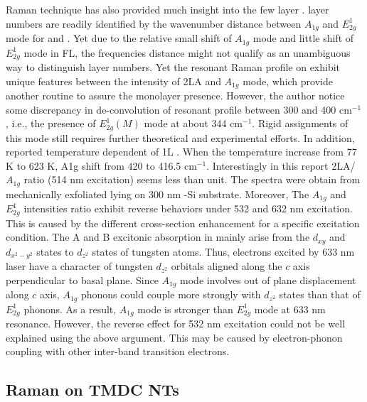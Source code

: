 Raman technique has also provided much insight into the few layer .  layer numbers are readily identified by the wavenumber distance between $A_{1g}$ and $E_{2g}^1$ mode for \cite{Buscema2013} and \cite{Berkdemir2013}. Yet due to the relative small shift of $A_{1g}$ mode and little shift of $E_{2g}^1$ mode in  FL, the frequencies distance might not qualify as an unambiguous way to distinguish layer numbers. Yet the resonant Raman profile on  exhibit unique features between the intensity of 2LA and $A_{1g}$ mode,\cite{Berkdemir2013,Zhao2013} which provide another routine to assure the monolayer presence. However, the author notice some discrepancy in de-convolution of  resonant profile between 300 and 400 cm$^{-1}$, i.e., the presence of $E_{2g}^1(M)$ mode at about 344 cm$^{-1}$.\cite{Peimyoo2013,Cong2013,Berkdemir2013} Rigid assignments of this mode still requires further theoretical\cite{Ataca2012} and experimental efforts. In addition, \citeauthor{M2013} reported temperature dependent of 1L .\cite{M2013} When the temperature increase from 77 K to 623 K, A1g shift from 420 to 416.5 cm$^{-1}$. Interestingly in this report 2LA/$A_{1g}$ ratio (514 nm excitation) seems less than unit. The spectra were obtain from mechanically exfoliated  lying on 300 nm -Si substrate. Moreover, The $A_{1g}$ and $E_{2g}^1$ intensities ratio exhibit reverse behaviors under 532 and 632 nm excitation. This is caused by the different cross-section enhancement for a specific excitation condition. The A and B excitonic absorption in  mainly arise from the $d_{xy}$ and $d_{x^2 - y^2}$ states to $d_{z^2}$ states of tungsten atoms. Thus, electrons excited by 633 nm laser have a character of tungsten $d_{z^2}$ orbitals aligned along the $c$ axis perpendicular to  basal plane. Since $A_{1g}$ mode involves out of plane displacement along $c$ axis, $A_{1g}$ phonons could couple more strongly with $d_{z^2}$ states than that of $E_{2g}^1$ phonons. As a result, $A_{1g}$ mode is stronger than $E_{2g}^1$ mode at 633 nm resonance.\cite{Zhao2013} However, the reverse effect for 532 nm excitation could not be well explained using the above argument. This may be caused by electron-phonon coupling with other inter-band transition electrons.

\subsection{Raman on TMDC NTs}\label{sec:ntram}

